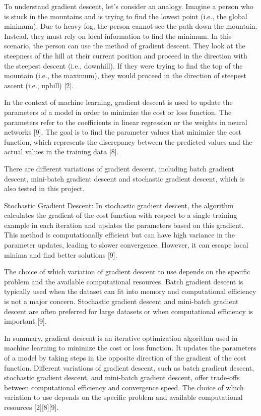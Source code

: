 \documentclass[inscr,ack,preface]{diphdthesis}
\begin{document}
To understand gradient descent, let's consider an analogy. Imagine a person who is stuck in the mountains and is trying to find the lowest point (i.e., the global minimum). Due to heavy fog, the person cannot see the path down the mountain. Instead, they must rely on local information to find the minimum. In this scenario, the person can use the method of gradient descent. They look at the steepness of the hill at their current position and proceed in the direction with the steepest descent (i.e., downhill). If they were trying to find the top of the mountain (i.e., the maximum), they would proceed in the direction of steepest ascent (i.e., uphill) [2].

In the context of machine learning, gradient descent is used to update the parameters of a model in order to minimize the cost or loss function. The parameters refer to the coefficients in linear regression or the weights in neural networks [9]. The goal is to find the parameter values that minimize the cost function, which represents the discrepancy between the predicted values and the actual values in the training data [8].

There are different variations of gradient descent, including batch gradient descent, mini-batch gradient descent and stochastic gradient descent, which is also tested in this project.

    Stochastic Gradient Descent: In stochastic gradient descent, the algorithm calculates the gradient of the cost function with respect to a single training example in each iteration and updates the parameters based on this gradient. This method is computationally efficient but can have high variance in the parameter updates, leading to slower convergence. However, it can escape local minima and find better solutions [9].

The choice of which variation of gradient descent to use depends on the specific problem and the available computational resources. Batch gradient descent is typically used when the dataset can fit into memory and computational efficiency is not a major concern. Stochastic gradient descent and mini-batch gradient descent are often preferred for large datasets or when computational efficiency is important [9].

In summary, gradient descent is an iterative optimization algorithm used in machine learning to minimize the cost or loss function. It updates the parameters of a model by taking steps in the opposite direction of the gradient of the cost function. Different variations of gradient descent, such as batch gradient descent, stochastic gradient descent, and mini-batch gradient descent, offer trade-offs between computational efficiency and convergence speed. The choice of which variation to use depends on the specific problem and available computational resources [2][8][9].
\end{document}
